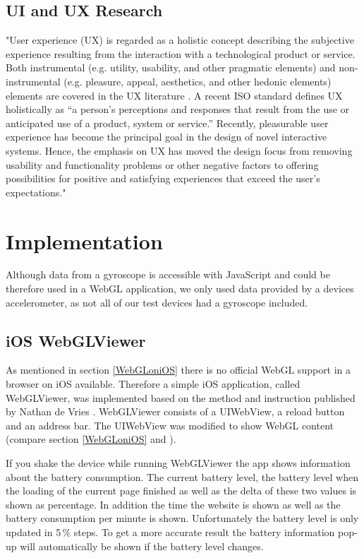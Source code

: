 \documentclass[12pt,journal,compsoc]{IEEEtran}
\begin{document}
\subsection{UI and UX Research}
"User experience (UX) is regarded as a holistic concept describing the subjective experience resulting from the interaction with a technological product or service. Both instrumental (e.g. utility, usability, and other pragmatic elements) and non- instrumental (e.g. pleasure, appeal, aesthetics, and other hedonic elements) elements are covered in the UX literature \cite{Hassenzahl2006}. A recent ISO standard \cite{FDIS2009} defines UX holistically as “a person's perceptions and responses that result from the use or anticipated use of a product, system or service.” Recently, pleasurable user experience has become the principal goal in the design of novel interactive systems. Hence, the emphasis on UX has moved the design focus from removing usability and functionality problems or other negative factors to offering possibilities for positive and satisfying experiences that exceed the user’s expectations."




\section{Implementation}
Although data from a gyroscope is accessible with JavaScript and could be therefore used in a WebGL application, we only used data provided by a devices accelerometer, as not all of our test devices had a gyroscope included.

\subsection{iOS WebGLViewer}
	As mentioned in section \ref{WebGLoniOS} there is no official WebGL support in a browser on iOS available. Therefore a simple iOS application, called WebGLViewer, was implemented based on the method and instruction published by Nathan de Vries \cite{deVries2011}. WebGLViewer consists of a UIWebView, a reload button and an address bar. The UIWebView was modified to show WebGL content (compare section \ref{WebGLoniOS} and \cite{deVries2011}). 
	
	If you shake the device while running WebGLViewer the app shows information about the battery consumption. The current battery level, the battery level when the loading of the current page finished as well as the delta of these two values is shown as percentage. In addition the time the website is shown as well as the battery consumption per minute is shown. Unfortunately the battery level is only updated in 5\,\% steps. To get a more accurate result the battery information pop-up will automatically be shown if the battery level changes.
	
\end{document}
